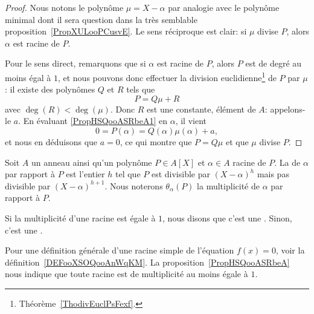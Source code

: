 \begin{proof}
	Nous notons le polynôme \( \mu=X-\alpha\) par analogie avec le polynôme minimal dont il sera question dans la très semblable proposition~\ref{PropXULooPCusvE}. Le sens réciproque est clair: si \( \mu\) divise \( P\), alors \( \alpha\) est racine de \( P\).

	Pour le sens direct, remarquons que si \( \alpha\) est racine de \( P\), alors \( P\) est de degré au moins égal à \( 1\), et nous pouvons donc effectuer la division euclidienne\footnote{Théorème~\ref{ThodivEuclPsFexf}.} de \( P\) par \( \mu\) : il existe des polynômes \( Q\) et \( R\) tels que
	\begin{equation} \label{PropHSQooASRbeA1}
		P=Q\mu+R
	\end{equation}
	avec \( \deg(R)<\deg(\mu)\). Donc \( R\) est une constante,
	élément de \( A\): appelons-le \( a\). En évaluant
	\eqref{PropHSQooASRbeA1} en \( \alpha\), il vient
	\begin{equation}
		0 = P(\alpha)=Q(\alpha)\mu(\alpha)+a,
	\end{equation}
	et nous en déduisons que \( a=0\), ce qui montre que \( P=Q\mu\) et que \( \mu\) divise \( P\).
\end{proof}

\begin{definition}     \label{DEFooTGZYooCYiKQa}
	Soit \( A\) un anneau ainsi qu'un polynôme \( P\in A[X]\) et \( \alpha\in A\) racine de \( P\). La  de \( \alpha\) par rapport à \( P\) est l'entier \( h\) tel que \( P\) est divisible par \( (X-\alpha)^h\) mais pas divisible par \( (X-\alpha)^{h+1}\).  Nous noterons \( \theta_{\alpha}(P)\) la multiplicité de \( \alpha\) par rapport à \( P\).

	Si la multiplicité d'une racine est égale à \( 1\), nous disons que c'est une . Sinon, c'est une .
\end{definition}

\begin{normaltext}
	Pour une définition générale d'une racine simple de l'équation \( f(x)=0\), voir la définition~\ref{DEFooXSOQooAnWqKM}. La proposition~\ref{PropHSQooASRbeA} nous indique que toute racine est de multiplicité au moins égale à \( 1\).
\end{normaltext}


